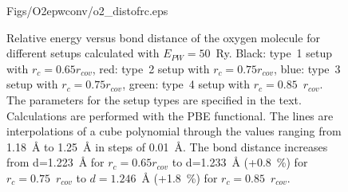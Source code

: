 \documentclass[11pt,a4paper]{report}
\begin{document}
\begin{figure}[h!]
\begin{center}
        {Figs/O2epwconv/o2_distofrc.eps}
\end{center}
\caption{\label{o2_dist}Relative energy versus bond distance of the
  oxygen molecule for different setups calculated with
  $E_{PW}=50$~Ry. Black: type~1 setup with $r_c=0.65 r_{cov}$, red:
  type~2 setup with $r_c=0.75 r_{cov}$, blue: type~3 setup with
  $r_c=0.75 r_{cov}$, green: type~4 setup with $r_c=0.85$~$r_{cov}$. The
  parameters for the setup types are specified in the
  text. Calculations are performed with the PBE functional. The lines
  are interpolations of a cube polynomial through the values ranging
  from 1.18~{\AA} to 1.25~{\AA} in steps of 0.01~{\AA}. The bond distance
  increases from d=1.223~{\AA} for $r_c=0.65 r_{cov}$ to d=1.233~{\AA}
  (+0.8~\%) for $r_c=0.75$~$r_{cov}$ to $d=1.246$~{\AA} (+1.8~\%) for
  $r_c=0.85$~$r_{cov}$.}
\end{figure}
\end{document}
